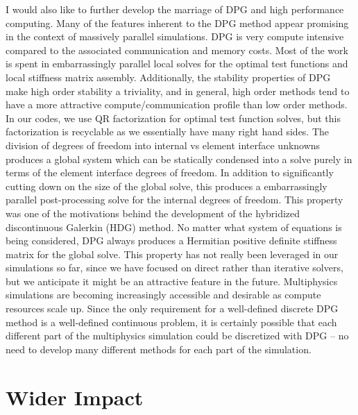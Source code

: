 \documentclass[letterpaper,12pt]{article}
\begin{document}
I would also like to further develop the marriage of DPG and high performance computing.
Many of the features inherent to the DPG method appear promising in the context of massively parallel simulations.
DPG is very compute intensive compared to the associated communication and memory costs.
Most of the work is spent in embarrassingly parallel local solves for the optimal test functions and local stiffness matrix assembly.
Additionally, the stability properties of DPG make high order stability a triviality, and in general, 
high order methods tend to have a more attractive compute/communication profile than low order methods.
In our codes, we use QR factorization for optimal test function solves, but this factorization is recyclable as we essentially have many right hand sides.
The division of degrees of freedom into internal vs element interface unknowns produces a global system which can be statically condensed into 
a solve purely in terms of the element interface degrees of freedom.
In addition to significantly cutting down on the size of the global solve, 
this produces a embarrassingly parallel post-processing solve for the internal degrees of freedom.
This property was one of the motivations behind the development of the hybridized discontinuous Galerkin (HDG) \cite{HDG} method.
No matter what system of equations is being considered, DPG always produces a Hermitian 
positive definite stiffness matrix for the global solve.
This property has not really been leveraged in our simulations so far, since we have focused on direct rather than iterative solvers, but we
anticipate it might be an attractive feature in the future.
Multiphysics simulations are becoming increasingly accessible and desirable as compute resources scale up.
Since the only requirement for a well-defined discrete DPG method is a well-defined continuous problem, 
it is certainly possible that each different part of the multiphysics simulation could be discretized with DPG -- 
no need to develop many different methods for each part of the simulation.

\section*{Wider Impact}
\end{document}
